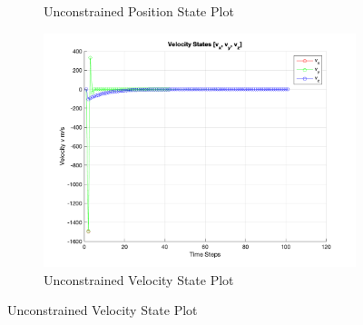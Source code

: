 \documentclass[conference, tikz]{IEEEtran}
\begin{document}
\begin{figure}[H]
\begin{subfigure}{\columnwidth}
        \caption{Unconstrained Position State Plot}
        \label{unconst:pos_state}
    \end{subfigure}
    \begin{subfigure}{\columnwidth}
        \centering
        \includegraphics[width=\columnwidth]{new_final_figs/Unconstrained_velocity_state_plot.png}
        \caption{Unconstrained Velocity State Plot}
        \label{unconst:vel_ss}
    \end{subfigure}
\end{figure}
\end{document}
